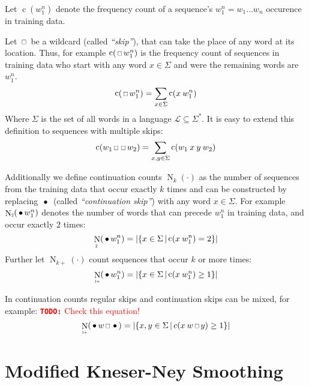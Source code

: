 \documentclass[11pt,a4paper]{report}
\newcommand*{\Scale}[2][4]{\scalebox{#1}{$#2$}}%
\newcommand{\DummyArg}{\cdot}
\newcommand{\Cardinality}[1]{\left|#1\right|}
\DeclareMathOperator{\Count}{c}
\DeclareMathOperator{\ContCount}{N}
\newcommand{\ContCountIp}  {\ContCount_{\Scale[0.5]{1+}}}
\newcommand{\ContCountII}  {\ContCount_{\Scale[0.5]{2 }}}
\newcommand{\Skp}{\ensuremath{\,\Scale[0.7]{\square}\,}}
\newcommand{\WSkp}{\ensuremath{\,\bullet\,}}
\newcommand{\Language}{\mathcal{L}}
\newcommand{\todo}[1]{\textcolor{red}{{\footnotesize\textbf{\texttt{TODO:}}} #1}}
\begin{document}
Let $\Count(w_1^n)$ denote the frequency count of a sequence's
$w_1^n = w_1 \ldots w_n$ occurence in training data.

Let $\Skp$ be a wildcard (called \emph{``skip''}), that can take the place
of any word at its location.
Thus, for example $\Count(\Skp w_1^n)$ is the frequency count of sequences
in training data who start with any word $x \in \Sigma$ and were the remaining
words are $w_1^n$.
\begin{equation}
  \Count(\Skp w_1^n) = \sum_{x \in \Sigma} \Count(x \: w_1^n)
\end{equation}
Where $\Sigma$ is the set of all words in a language
$\Language \subseteq \Sigma^{*}$.
It is easy to extend this definition to sequences with multiple skips:
\begin{equation}
  \Count(w_1 \Skp \Skp w_2) = \sum_{x, y \in \Sigma} \Count(w_1 \: x \: y \: w_2)
\end{equation}

Additionally we define continuation counts $\ContCount_k(\DummyArg)$ as the
number of sequences from the training data that occur exactly $k$ times and can
be constructed by replacing $\WSkp$ (called \emph{``continuation skip''}) with
any word $x \in \Sigma$.
For example $\ContCountII(\WSkp w_1^n)$ denotes the number of words that can
precede $w_1^n$ in training data, and occur exactly $2$ times:
\begin{equation}
  \ContCountII(\WSkp w_1^n) =
    \Cardinality{\left\{ x \in \Sigma \,\middle|\, \Count(x \: w_1^n) = 2 \right\}}
\end{equation}
Further let $\ContCount_{k+}(\DummyArg)$ count sequences that occur $k$ or more
times:
\begin{equation}
  \ContCountIp(\WSkp w_1^n) =
    \Cardinality{\left\{ x \in \Sigma \,\middle|\, \Count(x \: w_1^n) \geq 1 \right\}}
\end{equation}

In continuation counts regular skips and continuation skips can be mixed, for
example:
\todo{Check this equation!}
\begin{equation}
  \ContCountIp(\WSkp w \Skp \WSkp) =
    \Cardinality{\left\{ x, y \in \Sigma \,\middle|\, c(x \: w \Skp y) \geq 1 \right\}}
\end{equation}

\section{Modified Kneser-Ney Smoothing}
\label{sec:summary-lm-mkn}
\end{document}

